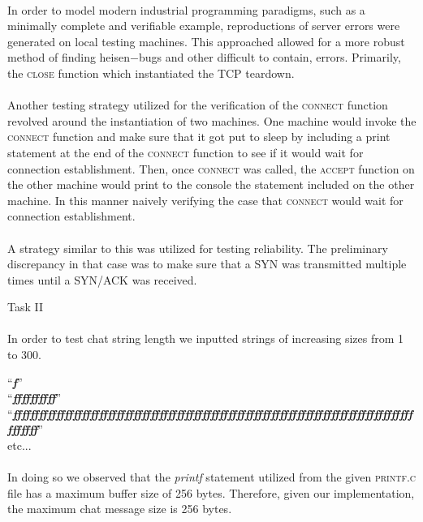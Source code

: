 \documentclass[12pt]{article}
\begin{document}
{\paragraph{} In order to model modern industrial programming paradigms, such as a minimally complete and verifiable example, reproductions of server errors were generated on local testing machines. This approached allowed for a more robust method of finding heisen$-$bugs and other difficult to contain, errors. Primarily, the \textsc{close} function which instantiated the TCP teardown.  
\paragraph{} Another testing strategy utilized for the verification of the \textsc{connect} function revolved around the instantiation of two machines. One machine would invoke the \textsc{connect} function and make sure that it got put to sleep by including a print statement at the end of the \textsc{connect} function to see if it would wait for connection establishment. Then, once \textsc{connect} was called, the \textsc{accept} function on the other machine would print to the console the statement included on the other machine. In this manner naively verifying the case that \textsc{connect} would wait for connection establishment.
\paragraph{} A strategy similar to this was utilized for testing reliability. The preliminary discrepancy in that case was to make sure that a \textsc{SYN} was transmitted multiple times until a \textsc{SYN/ACK} was received.  
\begin{center}
Task II
\end{center}
\paragraph{} In order to test chat string length we inputted strings of increasing sizes from 1 to 300. 
\begin{center}
``\textbf{\textit{f}}''\\
``\textbf{\textit{ffffffffff}}''\\
``\textbf{\textit{ffffffffffffffffffffffffffffffffffffffffffffffffffffffffffffffffffffffffffffffffffffffffffffffffffff}}''\\
etc...\\
\end{center}
\paragraph{} In doing so we observed that the \textit{printf} statement utilized from the given \textsc{printf.c} file has a maximum buffer size of 256 bytes. Therefore, given our implementation, the maximum chat message size is 256 bytes.
}
\end{document}
